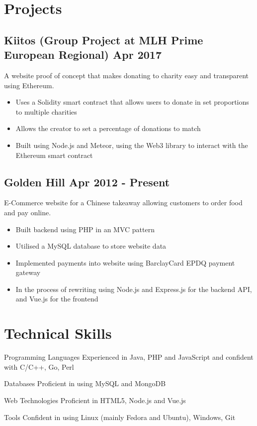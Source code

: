 \documentclass[a4paper]{article}
\begin{document}
\section*{Projects}

\subsection*{Kiitos \textnormal{(Group Project at MLH Prime European Regional)} \hfill Apr 2017}

A website proof of concept that makes donating to charity easy and transparent using Ethereum.

\begin{itemize}
    \item Uses a Solidity smart contract that allows users to donate in set proportions to multiple charities
    \item Allows the creator to set a percentage of donations to match
    \item Built using Node.js and Meteor, using the Web3 library to interact with the Ethereum smart contract
\end{itemize}

\subsection*{Golden Hill \hfill Apr 2012 - Present}

E-Commerce website for a Chinese takeaway allowing customers to order food and pay online.

\begin{itemize}
    \item Built backend using PHP in an MVC pattern
    \item Utilised a MySQL database to store website data
    \item Implemented payments into website using BarclayCard EPDQ payment gateway
    \item In the process of rewriting using Node.js and Express.js for the backend API, and Vue.js for the frontend
\end{itemize}

\section*{Technical Skills}

\vspace{6pt}

\begin{eqlist}
    \item[Programming Languages] Experienced in Java, PHP and JavaScript and confident with C/C++, Go, Perl
    \item[Databases] Proficient in using MySQL and MongoDB
    \item[Web Technologies] Proficient in HTML5, Node.js and Vue.js
    \item[Tools] Confident in using Linux (mainly Fedora and Ubuntu), Windows, Git
\end{eqlist}
\end{document}
